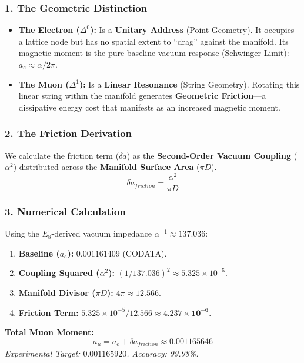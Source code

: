 \subsubsection*{1. The Geometric Distinction}
\begin{itemize}
    \item \textbf{The Electron ($\Delta^0$):} Is a \textbf{Unitary Address} (Point Geometry). It occupies a lattice node but has no spatial extent to ``drag'' against the manifold. Its magnetic moment is the pure baseline vacuum response (Schwinger Limit): $a_e \approx \alpha / 2\pi$.
    \item \textbf{The Muon ($\Delta^1$):} Is a \textbf{Linear Resonance} (String Geometry). Rotating this linear string within the manifold generates \textbf{Geometric Friction}—a dissipative energy cost that manifests as an increased magnetic moment.
\end{itemize}

\subsubsection*{2. The Friction Derivation}
We calculate the friction term ($\delta a$) as the \textbf{Second-Order Vacuum Coupling} ($\alpha^2$) distributed across the \textbf{Manifold Surface Area} ($\pi D$).
\begin{equation}
    \delta a_{friction} = \frac{\alpha^2}{\pi D}
\end{equation}

\subsubsection*{3. Numerical Calculation}
Using the $E_8$-derived vacuum impedance $\alpha^{-1} \approx 137.036$:
\begin{enumerate}
    \item \textbf{Baseline ($a_e$):} $0.001161409$ (CODATA).
    \item \textbf{Coupling Squared ($\alpha^2$):} $(1/137.036)^2 \approx 5.325 \times 10^{-5}$.
    \item \textbf{Manifold Divisor ($\pi D$):} $4\pi \approx 12.566$.
    \item \textbf{Friction Term:} $5.325 \times 10^{-5} / 12.566 \approx \mathbf{4.237 \times 10^{-6}}$.
\end{enumerate}

\textbf{Total Muon Moment:}
\begin{equation}
    a_\mu = a_e + \delta a_{friction} \approx \mathbf{0.001165646}
\end{equation}
\textit{Experimental Target: $0.001165920$. Accuracy: 99.98\%.}

